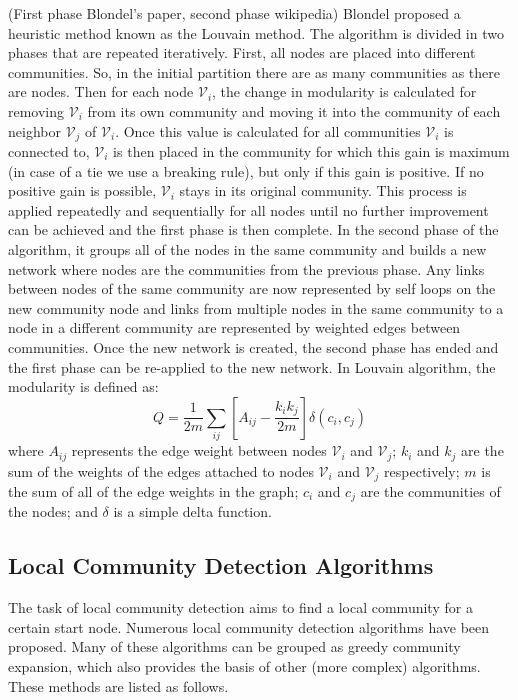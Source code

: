 \documentclass[\main/thesis.tex]{subfiles}
\begin{document}
(First phase Blondel's paper, second phase wikipedia) Blondel \cite{blondel2008fast} proposed a heuristic method known as the Louvain method. The algorithm is divided in two phases that are repeated iteratively. First, all nodes are placed into different communities. So, in the initial partition there are as many communities as there are nodes. Then for each node $\mathcal{V}_i$, the change in modularity is calculated for removing $\mathcal{V}_i$ from its own community and moving it into the community of each neighbor $\mathcal{V}_j$ of $\mathcal{V}_i$. Once this value is calculated for all communities $\mathcal{V}_i$ is connected to, $\mathcal{V}_i$ is then placed in the community for which this gain is maximum (in case of a tie we use a breaking rule), but only if this gain is positive. If no positive gain is possible, $\mathcal{V}_i$ stays in its original community. This process is applied repeatedly and sequentially for all nodes until no further improvement can be achieved and the first phase is then complete. In the second phase of the algorithm, it groups all of the nodes in the same community and builds a new network where nodes are the communities from the previous phase. Any links between nodes of the same community are now represented by self loops on the new community node and links from multiple nodes in the same community to a node in a different community are represented by weighted edges between communities. Once the new network is created, the second phase has ended and the first phase can be re-applied to the new network. In Louvain algorithm, the modularity is defined as: 
\begin{equation}
Q=\frac{1}{2m}\sum_{ij}[A_{ij}-\frac{k_ik_j}{2m}]\delta(c_i,c_j)
\end{equation}
where $A_{ij}$ represents the edge weight between nodes $\mathcal{V}_i$ and $\mathcal{V}_j$; $k_{i}$ and $k_j$ are the sum of the weights of the edges attached to nodes $\mathcal{V}_i$ and $\mathcal{V}_j$ respectively; $m$ is the sum of all of the edge weights in the graph; $c_{i}$ and $c_{j}$ are the communities of the nodes; and $\delta$ is a simple delta function.

\subsection{Local Community Detection Algorithms}
The task of local community detection aims to find a local community for a certain start node. Numerous local community detection algorithms have been proposed. Many of these algorithms can be grouped as greedy community expansion, which also provides the basis of other (more complex) algorithms. These methods are listed as follows.
\end{document}
